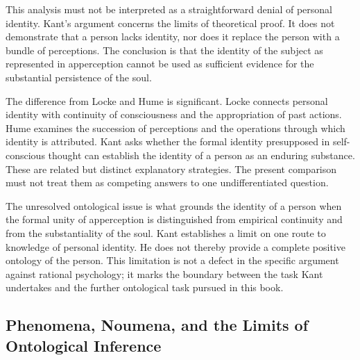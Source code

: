 This analysis must not be interpreted as
a straightforward denial of personal
identity. Kant's argument concerns the
limits of theoretical proof. It does not
demonstrate that a person lacks identity,
nor does it replace the person with a
bundle of perceptions. The conclusion
is that the identity of the subject as
represented in apperception cannot be
used as sufficient evidence for the
substantial persistence of the soul.

\label{para:VS.B01.P01.C08.S10.SS10.P004}

The difference from Locke and Hume is
significant. Locke connects personal
identity with continuity of consciousness
and the appropriation of past actions.
Hume examines the succession of perceptions
and the operations through which identity
is attributed. Kant asks whether the
formal identity presupposed in self-conscious
thought can establish the identity of a
person as an enduring substance. These
are related but distinct explanatory
strategies. The present comparison must
not treat them as competing answers to
one undifferentiated question.
\cite{KantCritiquePureReason}

\label{para:VS.B01.P01.C08.S10.SS10.P005}

The unresolved ontological issue is what
grounds the identity of a person when
the formal unity of apperception is
distinguished from empirical continuity
and from the substantiality of the soul.
Kant establishes a limit on one route
to knowledge of personal identity. He
does not thereby provide a complete
positive ontology of the person. This
limitation is not a defect in the
specific argument against rational
psychology; it marks the boundary
between the task Kant undertakes and
the further ontological task pursued
in this book.



\subsection{Phenomena, Noumena, and the Limits of Ontological Inference}
\label{subsec:ch08-kant-phenomena-noumena}

\label{para:VS.B01.P01.C08.S10.SS11.P001}

